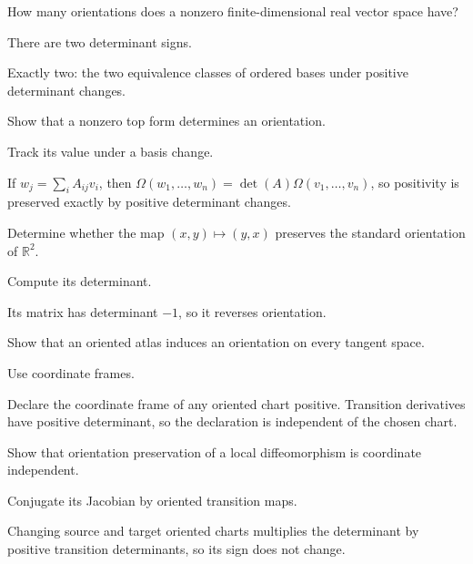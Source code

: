 \begin{exercise}\label{exr:vii10-02}
How many orientations does a nonzero finite-dimensional real vector space have?
\end{exercise}
\begin{hint}
There are two determinant signs.
\end{hint}
\begin{solution}
Exactly two: the two equivalence classes of ordered bases under positive determinant changes.
\end{solution}

\begin{exercise}\label{exr:vii10-03}
Show that a nonzero top form determines an orientation.
\end{exercise}
\begin{hint}
Track its value under a basis change.
\end{hint}
\begin{solution}
If $w_j=\sum_iA_{ij}v_i$, then $\Omega(w_1,\ldots,w_n)=\det(A)\Omega(v_1,\ldots,v_n)$, so positivity is preserved exactly by positive determinant changes.
\end{solution}

\begin{exercise}\label{exr:vii10-04}
Determine whether the map $(x,y)\mapsto(y,x)$ preserves the standard orientation of $\mathbb R^2$.
\end{exercise}
\begin{hint}
Compute its determinant.
\end{hint}
\begin{solution}
Its matrix has determinant $-1$, so it reverses orientation.
\end{solution}

\begin{exercise}\label{exr:vii10-05}
Show that an oriented atlas induces an orientation on every tangent space.
\end{exercise}
\begin{hint}
Use coordinate frames.
\end{hint}
\begin{solution}
Declare the coordinate frame of any oriented chart positive. Transition derivatives have positive determinant, so the declaration is independent of the chosen chart.
\end{solution}

\begin{exercise}\label{exr:vii10-06}
Show that orientation preservation of a local diffeomorphism is coordinate independent.
\end{exercise}
\begin{hint}
Conjugate its Jacobian by oriented transition maps.
\end{hint}
\begin{solution}
Changing source and target oriented charts multiplies the determinant by positive transition determinants, so its sign does not change.
\end{solution}

